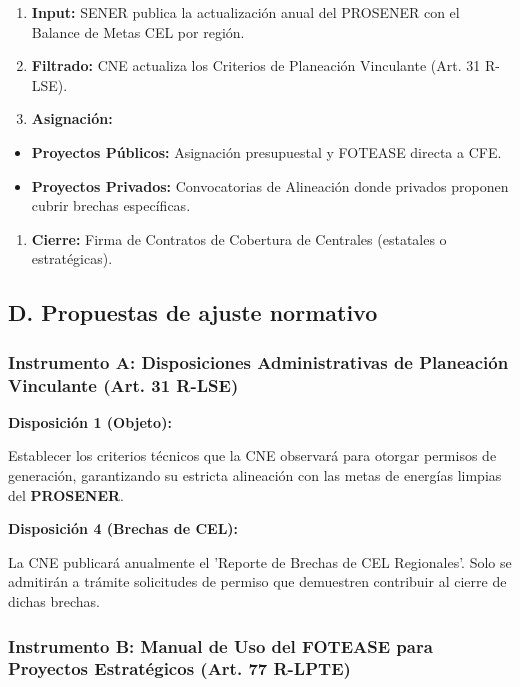 \documentclass{cel}
\begin{document}
\begin{enumerate}
\item \textbf{Input:} SENER publica la actualización anual del PROSENER con el \textquotedbl{}Balance de Metas CEL\textquotedbl{} por región.
\item \textbf{Filtrado:} CNE actualiza los Criterios de Planeación Vinculante (Art. 31 R-LSE).
\item \textbf{Asignación:}
\end{enumerate}
\begin{itemize}
\item \textbf{Proyectos Públicos:} Asignación presupuestal y FOTEASE directa a CFE.
\item \textbf{Proyectos Privados:} \textquotedbl{}Convocatorias de Alineación\textquotedbl{} donde privados proponen cubrir brechas específicas.
\end{itemize}
\begin{enumerate}
\item \textbf{Cierre:} Firma de Contratos de Cobertura de Centrales (estatales o estratégicas).

\end{enumerate}
\subsection{D. Propuestas de ajuste normativo}
\nopagebreak

\subsubsection{Instrumento A: Disposiciones Administrativas de Planeación Vinculante (Art. 31 R-LSE)}
\nopagebreak

\textbf{Disposición 1 (Objeto):}

\textquotedbl{}Establecer los criterios técnicos que la CNE observará para otorgar permisos de generación, garantizando su estricta alineación con las metas de energías limpias del \textbf{PROSENER}.\textquotedbl{}


\textbf{Disposición 4 (Brechas de CEL):}

\textquotedbl{}La CNE publicará anualmente el 'Reporte de Brechas de CEL Regionales'. Solo se admitirán a trámite solicitudes de permiso que demuestren contribuir al cierre de dichas brechas.\textquotedbl{}


\subsubsection{Instrumento B: Manual de Uso del FOTEASE para Proyectos Estratégicos (Art. 77 R-LPTE)}
\nopagebreak
\end{document}
